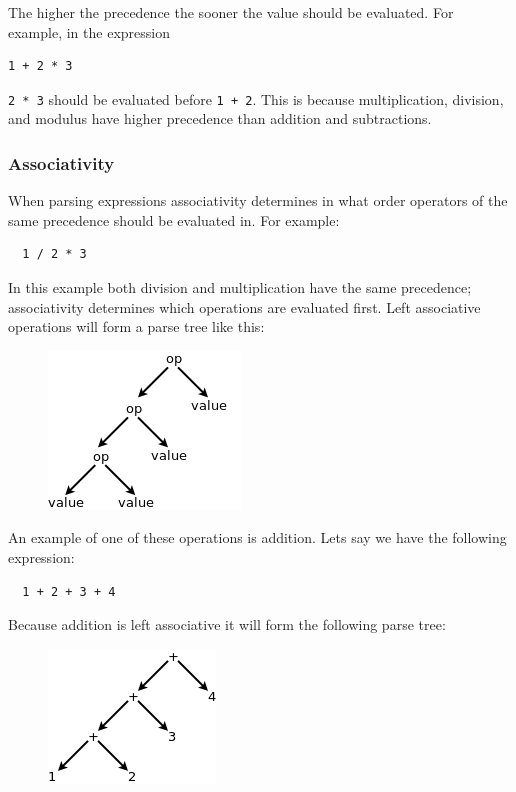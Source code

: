 \documentclass{article}
\newcommand{\code}[1]{\texttt{\textmd{#1}}}
\begin{document}
The higher the precedence the sooner the value should be evaluated. For example, in the expression
\begin{lstlisting}
1 + 2 * 3
\end{lstlisting}
\code{2 * 3} should be evaluated before \code{1 + 2}. This is because multiplication, division, and modulus
have higher precedence than addition and subtractions.

\subsubsection{Associativity}
When parsing expressions associativity determines in what order operators of the same precedence
should be evaluated in. For example:
\begin{lstlisting}
  1 / 2 * 3
\end{lstlisting}

In this example both division and multiplication have the same precedence; associativity determines
which operations are evaluated first. Left associative operations will form a parse tree like this:
\begin{figure}[H]
  \centering
  \includegraphics{static/left-assoc-gen.png}
\end{figure}

An example of one of these operations is addition. Lets say we have the following expression:
\begin{lstlisting}
  1 + 2 + 3 + 4
\end{lstlisting}

Because addition is left associative it will form the following parse tree:
\begin{figure}[H]
  \centering
  \includegraphics{static/left-assoc-plus.png}
\end{figure}
\end{document}
